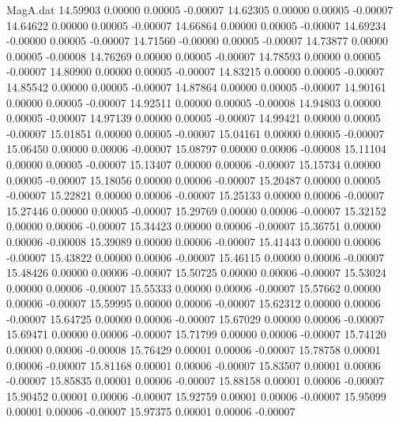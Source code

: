 \begin{filecontents}{MagA.dat}
  14.59903    0.00000    0.00005   -0.00007
  14.62305    0.00000    0.00005   -0.00007
  14.64622    0.00000    0.00005   -0.00007
  14.66864    0.00000    0.00005   -0.00007
  14.69234   -0.00000    0.00005   -0.00007
  14.71560   -0.00000    0.00005   -0.00007
  14.73877    0.00000    0.00005   -0.00008
  14.76269    0.00000    0.00005   -0.00007
  14.78593    0.00000    0.00005   -0.00007
  14.80900    0.00000    0.00005   -0.00007
  14.83215    0.00000    0.00005   -0.00007
  14.85542    0.00000    0.00005   -0.00007
  14.87864    0.00000    0.00005   -0.00007
  14.90161    0.00000    0.00005   -0.00007
  14.92511    0.00000    0.00005   -0.00008
  14.94803    0.00000    0.00005   -0.00007
  14.97139    0.00000    0.00005   -0.00007
  14.99421    0.00000    0.00005   -0.00007
  15.01851    0.00000    0.00005   -0.00007
  15.04161    0.00000    0.00005   -0.00007
  15.06450    0.00000    0.00006   -0.00007
  15.08797    0.00000    0.00006   -0.00008
  15.11104    0.00000    0.00005   -0.00007
  15.13407    0.00000    0.00006   -0.00007
  15.15734    0.00000    0.00005   -0.00007
  15.18056    0.00000    0.00006   -0.00007
  15.20487    0.00000    0.00005   -0.00007
  15.22821    0.00000    0.00006   -0.00007
  15.25133    0.00000    0.00006   -0.00007
  15.27446    0.00000    0.00005   -0.00007
  15.29769    0.00000    0.00006   -0.00007
  15.32152    0.00000    0.00006   -0.00007
  15.34423    0.00000    0.00006   -0.00007
  15.36751    0.00000    0.00006   -0.00008
  15.39089    0.00000    0.00006   -0.00007
  15.41443    0.00000    0.00006   -0.00007
  15.43822    0.00000    0.00006   -0.00007
  15.46115    0.00000    0.00006   -0.00007
  15.48426    0.00000    0.00006   -0.00007
  15.50725    0.00000    0.00006   -0.00007
  15.53024    0.00000    0.00006   -0.00007
  15.55333    0.00000    0.00006   -0.00007
  15.57662    0.00000    0.00006   -0.00007
  15.59995    0.00000    0.00006   -0.00007
  15.62312    0.00000    0.00006   -0.00007
  15.64725    0.00000    0.00006   -0.00007
  15.67029    0.00000    0.00006   -0.00007
  15.69471    0.00000    0.00006   -0.00007
  15.71799    0.00000    0.00006   -0.00007
  15.74120    0.00000    0.00006   -0.00008
  15.76429    0.00001    0.00006   -0.00007
  15.78758    0.00001    0.00006   -0.00007
  15.81168    0.00001    0.00006   -0.00007
  15.83507    0.00001    0.00006   -0.00007
  15.85835    0.00001    0.00006   -0.00007
  15.88158    0.00001    0.00006   -0.00007
  15.90452    0.00001    0.00006   -0.00007
  15.92759    0.00001    0.00006   -0.00007
  15.95099    0.00001    0.00006   -0.00007
  15.97375    0.00001    0.00006   -0.00007

\end{filecontents}
